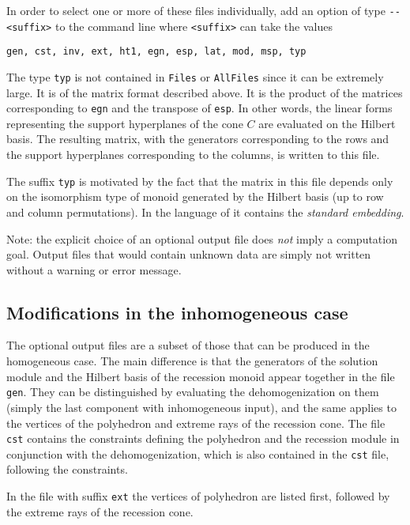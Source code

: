 \documentclass[12pt,a4paper]{scrartcl}
\theoremstyle{definition}
\def\ttt{\texttt}
\begin{document}
In order to select one or more of these files individually, add an option of type \verb|--<suffix>| to the command line where \verb|<suffix>| can take the values
\begin{Verbatim}
gen, cst, inv, ext, ht1, egn, esp, lat, mod, msp, typ
\end{Verbatim}

The type \verb|typ| is not contained in \verb|Files| or \verb|AllFiles| since it can be extremely large. It is of the matrix format described above. It is the product of the matrices
corresponding to \ttt{egn} and the transpose of \ttt{esp}. In other
words, the linear forms representing the support
hyperplanes of the cone $C$ are evaluated on the
Hilbert basis. The resulting matrix, with the
generators corresponding to the rows and the support
hyperplanes corresponding to the columns, is written to
this file.

The suffix \ttt{typ} is motivated by the fact that the
matrix in this file depends only on the isomorphism
type of monoid generated by the Hilbert basis (up to
row and column permutations). In the language of
\cite{BG} it contains the \emph{standard embedding}. 

Note: the explicit choice of an optional output file does \emph{not} imply a computation goal. Output files that would contain unknown data are simply not written without a warning or error message.

\subsection{Modifications in the inhomogeneous case}

The optional output files  are a subset of those that can be produced in the homogeneous
case. The main difference is that the generators of the solution module and the
Hilbert basis of the recession monoid appear together in the file \verb|gen|.
They can be distinguished by evaluating the dehomogenization on them (simply the last component with inhomogeneous input), and the
same applies to the  vertices of the polyhedron and extreme rays of the
recession cone. The file \verb|cst| contains the constraints defining the
polyhedron and the recession module in conjunction with the dehomogenization, which is also contained in the \verb|cst| file, following the constraints.

In the file with suffix \verb|ext| the vertices of polyhedron are listed first, followed by the extreme rays of the recession cone.
\end{document}
